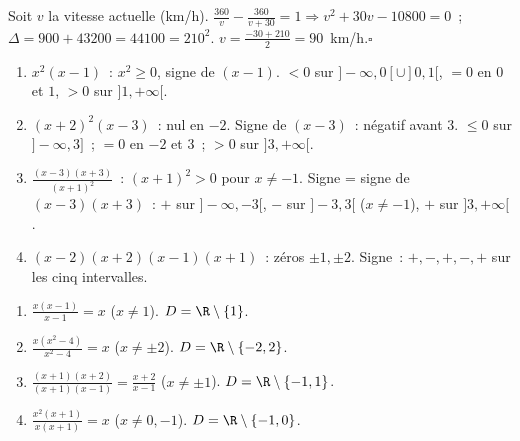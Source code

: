
Soit $v$ la vitesse actuelle (km/h).
$\frac{360}{v}-\frac{360}{v+30}=1\Rightarrow v^2+30v-10800=0$~; $\Delta=900+43200=44100=210^2$.
$v=\frac{-30+210}{2}=90$~km/h.\hfill$\square$


\begin{enumerate}
  \item $x^2(x-1)$~: $x^2\geq0$, signe de $(x-1)$.
        $<0$ sur $]-\infty,0[\cup]0,1[$, $=0$ en $0$ et $1$, $>0$ sur $]1,+\infty[$.
  \item $(x+2)^2(x-3)$~: nul en $-2$. Signe de $(x-3)$~: n\'egatif avant $3$.
        $\leq0$ sur $]-\infty,3]$~; $=0$ en $-2$ et $3$~; $>0$ sur $]3,+\infty[$.
  \item $\frac{(x-3)(x+3)}{(x+1)^2}$~: $(x+1)^2>0$ pour $x\ne-1$.
        Signe = signe de $(x-3)(x+3)$~: $+$ sur $]-\infty,-3[$, $-$ sur $]-3,3[$ ($x\ne-1$),
        $+$ sur $]3,+\infty[$.
  \item $(x-2)(x+2)(x-1)(x+1)$~: z\'eros $\pm1,\pm2$.
        Signe~: $+,-,+,-,+$ sur les cinq intervalles.
\end{enumerate}


\begin{enumerate}
  \item $\frac{x(x-1)}{x-1}=x$ ($x\ne1$). $D=\R\setminus\{1\}$.
  \item $\frac{x(x^2-4)}{x^2-4}=x$ ($x\ne\pm2$). $D=\R\setminus\{-2,2\}$.
  \item $\frac{(x+1)(x+2)}{(x+1)(x-1)}=\frac{x+2}{x-1}$ ($x\ne\pm1$). $D=\R\setminus\{-1,1\}$.
  \item $\frac{x^2(x+1)}{x(x+1)}=x$ ($x\ne0,-1$). $D=\R\setminus\{-1,0\}$.
\end{enumerate}


